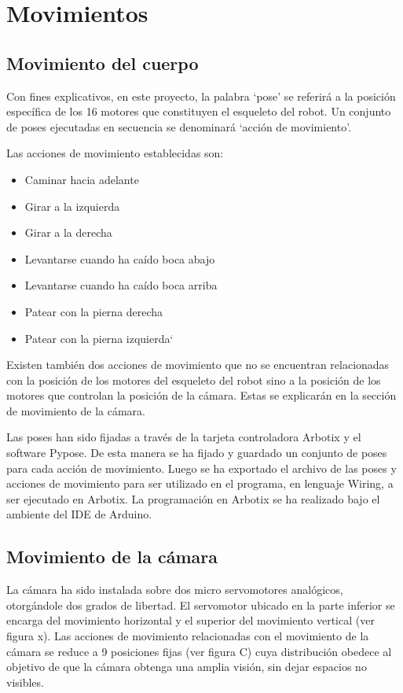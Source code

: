 \chapter{Movimientos}\label{chapter:Movimientos}

\section{Movimiento del cuerpo}

Con fines explicativos, en este proyecto, la palabra ‘pose’ se referirá a la posición específica de los 16 motores que constituyen el esqueleto del robot. Un conjunto de poses ejecutadas en secuencia se denominará ‘acción de movimiento’.


Las acciones de movimiento establecidas son:


\begin{itemize}
 \item {Caminar hacia adelante}
 \item {Girar a la izquierda}
 \item {Girar a la derecha}
 \item {Levantarse cuando ha caído boca abajo}
 \item {Levantarse cuando ha caído boca arriba}
 \item {Patear con la pierna derecha }
 \item {Patear con la pierna izquierda`}
 
\end{itemize}

Existen también dos acciones de movimiento que no se encuentran relacionadas con la posición de los motores del esqueleto del robot sino a la posición de los motores que controlan la posición de la cámara. Estas se explicarán en la sección de movimiento de la cámara.

Las poses han sido fijadas a través de la tarjeta controladora Arbotix y el software Pypose. De esta manera se ha fijado y guardado un conjunto de poses para cada acción de movimiento. Luego se ha exportado el archivo de las poses y acciones de movimiento para ser utilizado en el programa, en lenguaje Wiring, a ser ejecutado en Arbotix. La programación en Arbotix se ha realizado bajo el ambiente del IDE de Arduino. 


\section{Movimiento de la cámara}
La cámara ha sido instalada sobre dos micro servomotores analógicos, otorgándole dos grados de libertad. El servomotor ubicado en la parte inferior se encarga del movimiento horizontal y el superior del movimiento vertical (ver figura x). Las acciones de movimiento relacionadas con el movimiento de la cámara se reduce a 9 posiciones fijas (ver figura C) cuya distribución obedece al objetivo de que la cámara obtenga una amplia visión, sin dejar espacios no visibles. 



